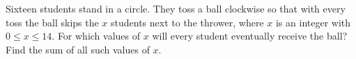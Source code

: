 Sixteen students stand in a circle. They toss a ball clockwise so that with every toss the ball skips the \(x\) students next to the thrower, where \(x\) is an integer with \(0\le x\le14\). For which values of \(x\) will every student eventually receive the ball? Find the sum of all such values of \(x\).
